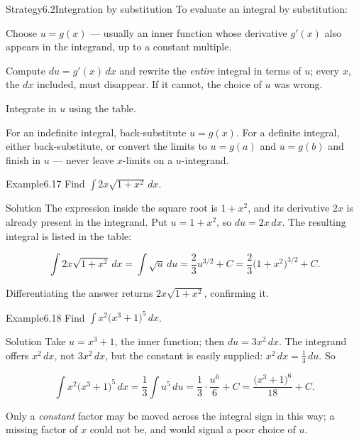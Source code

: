 \documentclass[a4paper,12pt,oneside]{memoir}
\begin{document}
\begin{envstrategy}{Strategy}{6.2}{Integration by substitution}
To evaluate an integral by substitution:

\begin{steps}
  \item Choose \(u = g(x)\) — usually an inner function whose derivative \(g'(x)\) also appears in the integrand, up to a constant multiple.
  \item Compute \(du = g'(x)\,dx\) and rewrite the \emph{entire} integral in terms of \(u\); every \(x\), the \(dx\) included, must disappear. If it cannot, the choice of \(u\) was wrong.
  \item Integrate in \(u\) using the table.
  \item For an indefinite integral, back-substitute \(u = g(x)\). For a definite integral, either back-substitute, or convert the limits to \(u = g(a)\) and \(u = g(b)\) and finish in \(u\) — never leave \(x\)-limits on a \(u\)-integrand.
\end{steps}
\end{envstrategy}
\begin{workedexample}
\begin{envexample}{Example}{6.17}{}
Find \(\displaystyle\int 2x\sqrt{1 + x^{2}}\,dx\).
\end{envexample}
\begin{envsolution}{Solution}{}{}
The expression inside the square root is \(1 + x^{2}\), and its derivative \(2x\) is already present in the integrand. Put \(u = 1 + x^{2}\), so \(du = 2x\,dx\). The resulting integral is listed in the table:

\[ \int 2x\sqrt{1 + x^{2}}\,dx = \int \sqrt{u}\,du = \frac{2}{3}u^{3/2} + C = \frac{2}{3}\bigl(1 + x^{2}\bigr)^{3/2} + C. \]

Differentiating the answer returns \(2x\sqrt{1 + x^{2}}\), confirming it. \qedmark
\end{envsolution}
\end{workedexample}
\begin{workedexample}
\begin{envexample}{Example}{6.18}{}
Find \(\displaystyle\int x^{2}\bigl(x^{3} + 1\bigr)^{5}\,dx\).
\end{envexample}
\begin{envsolution}{Solution}{}{}
Take \(u = x^{3} + 1\), the inner function; then \(du = 3x^{2}\,dx\). The integrand offers \(x^{2}\,dx\), not \(3x^{2}\,dx\), but the constant is easily supplied: \(x^{2}\,dx = \tfrac{1}{3}\,du\). So

\[ \int x^{2}\bigl(x^{3} + 1\bigr)^{5}\,dx = \frac{1}{3}\int u^{5}\,du = \frac{1}{3}\cdot\frac{u^{6}}{6} + C = \frac{\bigl(x^{3} + 1\bigr)^{6}}{18} + C. \]

Only a \emph{constant} factor may be moved across the integral sign in this way; a missing factor of \(x\) could not be, and would signal a poor choice of \(u\). \qedmark
\end{envsolution}
\end{workedexample}
\end{document}

